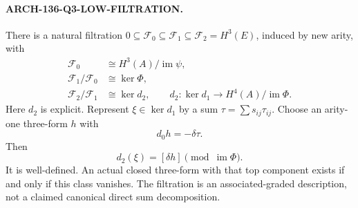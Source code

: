 \paragraph{ARCH-136-Q3-LOW-FILTRATION.}
There is a natural filtration
\(0\subseteq\mathcal F_0\subseteq\mathcal F_1
\subseteq\mathcal F_2=H^3(E)\), induced by new arity, with
\[
 \begin{aligned}
 \mathcal F_0&\cong H^3(A)/\operatorname{im}\psi,\\
 \mathcal F_1/\mathcal F_0&\cong\ker\Phi,\\
 \mathcal F_2/\mathcal F_1&\cong\ker d_2,
 \qquad d_2:\ker d_1\longrightarrow H^4(A)/\operatorname{im}\Phi.
 \end{aligned}                                                \tag{136.QF10}
\]
Here \(d_2\) is explicit.  Represent \(\xi\in\ker d_1\)
by a sum \(\tau=\sum s_{ij}\tau_{ij}\).  Choose an
arity-one three-form \(h\) with
\[
                         d_0h=-\delta\tau.
\]
Then
\[
                            d_2(\xi)=[\delta h]
                                  \pmod{\operatorname{im}\Phi}.
                                                               \tag{136.QF11}
\]
It is well-defined.  An actual closed three-form with that top
component exists if and only if this class vanishes.  The
filtration is an associated-graded description, not a claimed
canonical direct sum decomposition.

